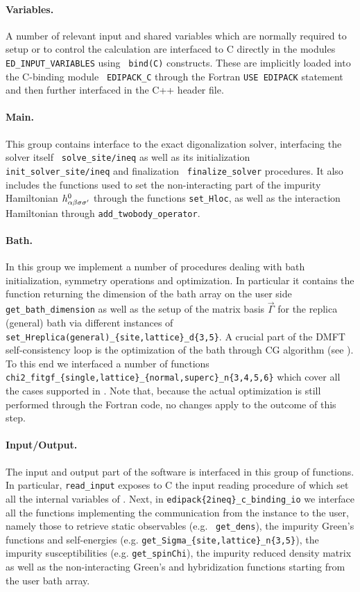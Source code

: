 \documentclass[edipack_sp.tex]{subfiles}
\begin{document}
\paragraph{{\bf Variables}.}
A number of relevant input and shared variables which are normally
required to setup or to control the calculation are interfaced to C
directly in the \NAME modules {\tt ED\_INPUT\_VARIABLES} using {\tt
  bind(C)} constructs. These are implicitly loaded into the C-binding module {\tt
  EDIPACK\_C} through the Fortran {\tt USE EDIPACK} statement and
then further interfaced in the C++ header file. 


\paragraph{{\bf Main}.} This group contains interface to the exact
digonalization solver, interfacing the solver itself {\tt
  solve\_site/ineq} as well as its initialization
{\tt init\_solver\_site/ineq} and finalization {\tt
  finalize\_solver} procedures. It also includes the functions used to
set the non-interacting part of the impurity Hamiltonian
$h^0_{\alpha\beta\sigma\sigma'}$ through the functions {\tt set\_Hloc}, as well as the
interaction Hamiltonian through {\tt add\_twobody\_operator}.


\paragraph{{\bf Bath}.} In this group we implement a number of
procedures dealing with bath initialization, symmetry operations and
optimization. In particular it contains the function returning the
dimension of the bath array on the user side {\tt
  get\_bath\_dimension} as well as the setup of the matrix basis
$\vec{\Gamma}$ for the replica (general) bath via different instances of
{\tt set\_Hreplica(general)\_\-\{site,lattice\}\_d\{3,5\}}. 
A crucial part of the DMFT self-consistency loop is the optimization of the bath through CG algorithm (see ). To this end we interfaced a
number of functions {\tt
  chi2\_fitgf\_\{single,lattice\}\_\{normal,superc\}\_n\{3,4,5,6\}} which
cover all the cases supported in \NAME. Note that, because the actual
optimization is still performed through the Fortran code, no changes
apply to the outcome of this step.    

\paragraph{{\bf Input/Output}.}
The input and output part of the software is interfaced in this group
of functions. In particular, {\tt read\_input} exposes to C the input
reading procedure of \NAME which set all the internal
variables of \NAME.
Next, in {\tt edipack\{2ineq\}\_c\_binding\_io} we interface all the
functions implementing the communication from the \NAME instance to
the user, namely those to retrieve static observables (e.g. {\tt
  get\_dens}), the impurity Green's functions and self-energies
(e.g. {\tt get\_Sigma\_\{site,lattice\}\_n\{3,5\}}), the
impurity susceptibilities (e.g. {\tt get\_spinChi}), the impurity reduced density matrix as well
as the non-interacting Green's and hybridization functions starting from the user bath array.   
\end{document}
